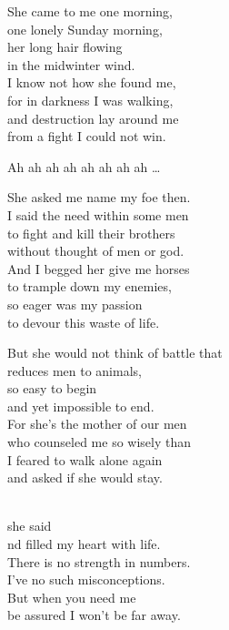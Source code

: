 
\ve{}
She came to me one morning,\\
one lonely Sunday morning,\\
her long hair flowing\\
in the midwinter wind.\\
I know not how she found me,\\
for in darkness I was walking,\\
and destruction lay around me\\
from a fight I could not win.

\re{}
Ah \quad {}ah ah \quad {}ah ah ah ah ah \ldots{}

\ve{}
She asked me name my foe then.\\
I said the need within some men\\
to fight and kill their brothers\\
without thought of men or god.\\
And I begged her give me horses\\
to trample down my enemies,\\
so eager was my passion\\
to devour this waste of life.

\ve{}
But she would not think of battle that\\
reduces men to animals,\\
so easy to begin\\
and yet impossible to end.\\
For she's the mother of our men\\
who counseled me so wisely than\\
I feared to walk alone again\\
and asked if she would stay.

\ve{}
\\
 she said \\
nd filled my heart with life.\\
There is no strength in numbers.\\
I've no such misconceptions.\\
But when you need me\\
be assured I won't be far away.


